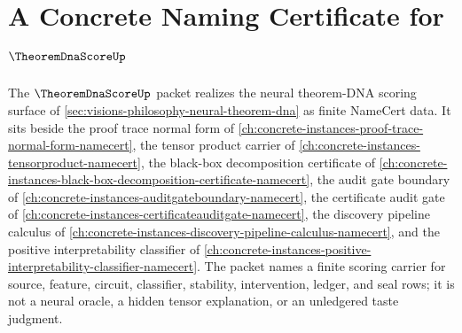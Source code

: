 \chapter{A Concrete Naming Certificate for $\TheoremDnaScoreUp$}
\label{ch:concrete-instances-theorem-dna-score-namecert}

The $\TheoremDnaScoreUp$ packet realizes the neural theorem-DNA scoring surface of \autoref{sec:visions-philosophy-neural-theorem-dna} as finite NameCert data. It sits beside the proof trace normal form of \autoref{ch:concrete-instances-proof-trace-normal-form-namecert}, the tensor product carrier of \autoref{ch:concrete-instances-tensorproduct-namecert}, the black-box decomposition certificate of \autoref{ch:concrete-instances-black-box-decomposition-certificate-namecert}, the audit gate boundary of \autoref{ch:concrete-instances-auditgateboundary-namecert}, the certificate audit gate of \autoref{ch:concrete-instances-certificateauditgate-namecert}, the discovery pipeline calculus of \autoref{ch:concrete-instances-discovery-pipeline-calculus-namecert}, and the positive interpretability classifier of \autoref{ch:concrete-instances-positive-interpretability-classifier-namecert}. The packet names a finite scoring carrier for source, feature, circuit, classifier, stability, intervention, ledger, and seal rows; it is not a neural oracle, a hidden tensor explanation, or an unledgered taste judgment.

